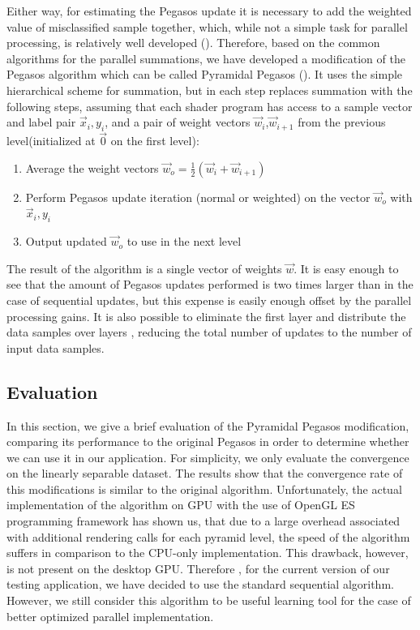 Either way, for estimating the Pegasos update it is necessary to add the weighted value of misclassified sample together, which, while not a simple task for parallel processing, is relatively well developed (\cite{fung}). Therefore, based on the common algorithms for the parallel summations, we have developed a modification of the Pegasos algorithm which can be called Pyramidal Pegasos (). It uses the simple hierarchical scheme for summation, but in each step replaces summation with the following steps, assuming that each shader program has access to a sample vector and label pair $\vec{x}_i, y_i$, and a pair of weight vectors $\vec{w}_{i}$,$\vec{w}_{i+1}$ from the previous level(initialized at $\vec{0}$ on the first level):
\begin{enumerate}
\item Average the weight vectors $\vec{w}_o=\frac{1}{2}\left(\vec{w}_{i}+\vec{w}_{i+1}\right)$
\item Perform Pegasos update iteration (normal or weighted) on the vector $\vec{w}_o$ with $\vec{x}_i, y_i$
\item Output updated $\vec{w}_o$ to use in the next level 
\end{enumerate}
The result of the algorithm is a single vector of weights $\vec{w}$. It is easy enough to see that the amount of Pegasos updates performed is two times larger than in the case of sequential updates, but this expense is easily enough offset by the parallel processing gains. It is also possible to eliminate the first layer and distribute the data samples over layers , reducing the total number of updates to the number of input data samples.
\subsection{Evaluation}
In this section, we give a brief evaluation of the Pyramidal Pegasos modification, comparing its performance to the original Pegasos in order to determine whether we can use it in our application. For simplicity, we only evaluate the convergence on the linearly separable dataset. The results show that the convergence rate of this modifications is similar to the original algorithm. Unfortunately, the actual implementation of the algorithm on GPU with the use of OpenGL ES programming framework has shown us, that due to a large overhead associated with additional rendering calls for each pyramid level, the speed of the algorithm suffers in comparison to the CPU-only implementation. This drawback, however, is not present on the desktop GPU. Therefore , for the current version of our testing application, we have decided to use the standard sequential algorithm. However, we still consider this algorithm to be useful learning tool for the case of better optimized parallel implementation. 
